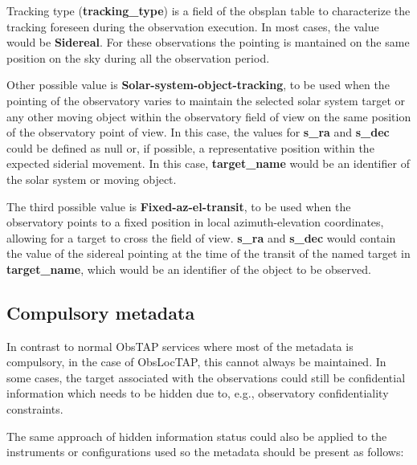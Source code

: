 \documentclass[11pt,a4paper]{ivoa}
\begin{document}
Tracking type (\textbf{tracking\_type}) is a field of the obsplan table
to characterize the tracking foreseen during the observation execution.  
In most cases, the value would be \textbf{Sidereal}. For these observations the
pointing is mantained on the same position on the sky during all the observation
period.

Other possible value is \textbf{Solar-system-object-tracking}, to be used when
the pointing of the observatory varies to maintain the selected solar system
target or any other moving object within the observatory field of view on the
same position of the observatory point of view. In this case, the
values for \textbf{s\_ra} and \textbf{s\_dec} could be defined as null or,
if possible, a representative position within the expected siderial movement.
In this case, \textbf{target\_name} would be an identifier of the solar system
or moving object.

The third possible value is \textbf{Fixed-az-el-transit}, to be used when the
observatory points to a fixed position in local azimuth-elevation coordinates,
allowing for a target to cross the field of view. \textbf{s\_ra} and 
\textbf{s\_dec} would contain the value of the sidereal pointing at the time
of the transit of the named target in \textbf{target\_name}, which would be
an identifier of the object to be observed.



\subsection{Compulsory metadata}
In contrast to normal ObsTAP services where most of the metadata is compulsory,
in the case of ObsLocTAP, this cannot always be maintained. In some cases, the
target associated with the observations could still be confidential information
which needs to be hidden due to, e.g., observatory confidentiality constraints.

The same approach of hidden information status could also be applied to the
instruments or configurations used so the metadata should be present as follows:
\end{document}
